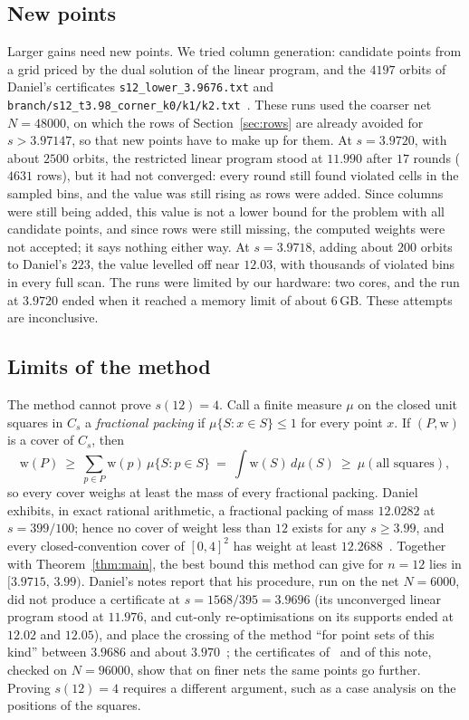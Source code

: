 \documentclass[11pt]{amsart}
\theoremstyle{definition}
\theoremstyle{remark}
\newcommand{\Cs}{C_s}
\newcommand{\wt}{\mathrm{w}}
\newcommand{\sdec}{3.9715}
\begin{document}
\subsection{New points}
Larger gains need new points. We tried column generation: candidate points from a grid priced by the dual solution of the linear program, and the $4197$ orbits of Daniel's certificates \texttt{s12\_lower\_3.9676.txt} and \texttt{branch/s12\_t3.98\_corner\_k0/k1/k2.txt}~\cite{Dan26}. These runs used the coarser net $N=48000$, on which the rows of Section~\ref{sec:rows} are already avoided for $s>3.97147$, so that new points have to make up for them. At $s=3.9720$, with about $2500$ orbits, the restricted linear program stood at $11.990$ after $17$ rounds ($4631$ rows), but it had not converged: every round still found violated cells in the sampled bins, and the value was still rising as rows were added. Since columns were still being added, this value is not a lower bound for the problem with all candidate points, and since rows were still missing, the computed weights were not accepted; it says nothing either way. At $s=3.9718$, adding about $200$ orbits to Daniel's $223$, the value levelled off near $12.03$, with thousands of violated bins in every full scan. The runs were limited by our hardware: two cores, and the run at $3.9720$ ended when it reached a memory limit of about $6$\,GB. These attempts are inconclusive.

\subsection{Limits of the method}
The method cannot prove $s(12)=4$. Call a finite measure $\mu$ on the closed unit squares in $\Cs$ a \emph{fractional packing} if $\mu\{S: x\in S\}\le1$ for every point $x$. If $(P,\wt)$ is a cover of $\Cs$, then
\[
  \wt(P)\ \ge\ \sum_{p\in P}\wt(p)\,\mu\{S: p\in S\}\ =\ \int\wt(S)\,d\mu(S)\ \ge\ \mu(\text{all squares}),
\]
so every cover weighs at least the mass of every fractional packing. Daniel exhibits, in exact rational arithmetic, a fractional packing of mass $12.0282$ at $s=399/100$; hence no cover of weight less than $12$ exists for any $s\ge3.99$, and every closed-convention cover of $[0,4]^2$ has weight at least $12.2688$~\cite{Dan26}. Together with Theorem~\ref{thm:main}, the best bound this method can give for $n=12$ lies in $[\sdec,\,3.99)$. Daniel's notes report that his procedure, run on the net $N=6000$, did not produce a certificate at $s=1568/395=3.9696$ (its unconverged linear program stood at $11.976$, and cut-only re-optimisations on its supports ended at $12.02$ and $12.05$), and place the crossing of the method ``for point sets of this kind'' between $3.9686$ and about $3.970$~\cite[\texttt{s12/search/TIGHTEN.md}]{Dan26}; the certificates of~\cite{Lev26b} and of this note, checked on $N=96000$, show that on finer nets the same points go further. Proving $s(12)=4$ requires a different argument, such as a case analysis on the positions of the squares.
\end{document}
